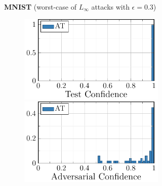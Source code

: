\begin{figure}[t]
    \begin{subfigure}[t]{0.485\textwidth}
        \vspace*{0px}
        
        \centering
        \textbf{MNIST} (worst-case of $L_\infty$ attacks with $\epsilon = 0.3$)
        
        \begin{subfigure}[t]{0.49\textwidth}
            \vspace*{0px}
            
            \centering
            \includegraphics[width=1\textwidth]{fig_mnist_corr_advtrain}
            
            \includegraphics[width=1\textwidth]{fig_mnist_succ_advtrain}
        \end{subfigure}
        \begin{subfigure}[t]{0.49\textwidth}
            \vspace*{0px}
            

\end{subfigure}
\end{subfigure}
\end{figure}
